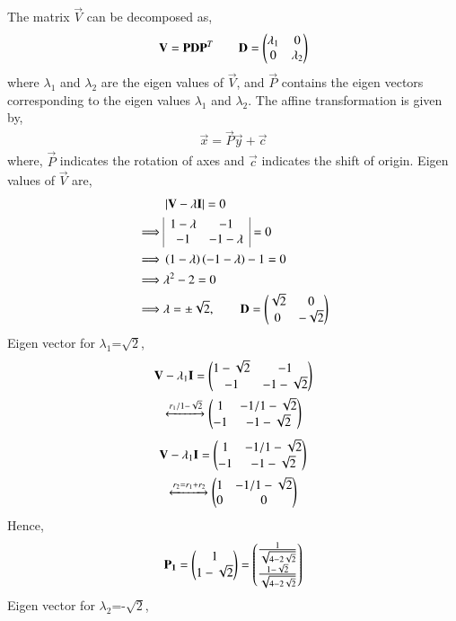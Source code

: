 \documentclass[journal,12pt,twocolumn]{IEEEtran}
\begin{document}
The matrix $\vec{V}$ can be decomposed as,
\begin{align}
	\mathbf V= \mathbf{P}\mathbf{D}\mathbf{P}^T \qquad \mathbf{D} = \begin{pmatrix}\lambda_1 & 0 \\ 0 & \lambda_2\end{pmatrix}
\end{align}
where $\lambda_1$ and $\lambda_2$ are the eigen values of $\vec{V}$, and $\vec{P}$ contains the eigen vectors corresponding to the eigen values $\lambda_1$ and $\lambda_2$. The affine transformation is given by,
\begin{align}
	\vec{x} = \vec{P}\vec{y} + \vec{c}
\end{align}
where, $\vec{P}$ indicates the rotation of axes and $\vec{c}$ indicates the shift of origin.
Eigen values of $\vec{V}$ are,
\begin{align}
	& \left\vert\mathbf{V}-\lambda\mathbf{I}\right\vert = 0 \\
\implies	& \begin{array}{|cc|}
		1-\lambda & -1\\ -1 & -1-\lambda
	\end{array}=0 \\
\implies & \left(1-\lambda\right)\left(-1-\lambda\right) -1 =0\\
\implies &\lambda^2 -2 =0 \\
\implies & \lambda = \pm \sqrt{2}, \qquad \mathbf{D} = \begin{pmatrix}\sqrt{2} &0 \\ 0 & -\sqrt{2}\end{pmatrix} 
\end{align}
Eigen vector for $\lambda_1$=$\sqrt{2}$,
\begin{multline}
	\mathbf{V}-\lambda_1\mathbf{I} = \begin{pmatrix}1-\sqrt{2} & -1 \\ -1 & -1-\sqrt{2}\end{pmatrix}\\
	 \xleftrightarrow[]{r_1/1-\sqrt{2}} \begin{pmatrix}1 & -1/1-\sqrt{2} \\ -1 & -1-\sqrt{2}\end{pmatrix}
\end{multline}
\begin{multline}
	\mathbf{V}-\lambda_1\mathbf{I} = \begin{pmatrix}1 & -1/1-\sqrt{2} \\ -1 & -1-\sqrt{2}\end{pmatrix} \\
	\xleftrightarrow[]{r_2 = r_1 + r_2} \begin{pmatrix}1 & -1/1-\sqrt{2} \\ 0 & 0\end{pmatrix}
\end{multline}
Hence,
\begin{align}
\mathbf{P_1}= \begin{pmatrix}1 \\ 1-\sqrt{2}\end{pmatrix} = \begin{pmatrix}\frac{1}{\sqrt{4-2\sqrt{2}}} \\ \frac{1-\sqrt{2}}{\sqrt{4-2\sqrt{2}}}\end{pmatrix}
\end{align}
Eigen vector for $\lambda_2$=-$\sqrt{2}$,
\end{document}

